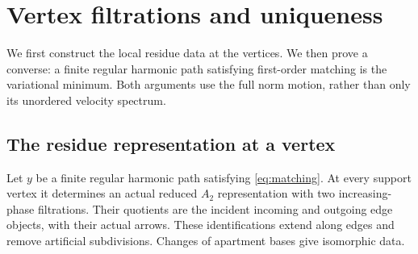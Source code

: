 \section{Vertex filtrations and uniqueness}\label{sec:matchinguniqueness}

We first construct the local residue data at the vertices. We then prove
a converse: a finite regular harmonic path satisfying first-order matching
is the variational minimum. Both arguments use the full norm motion,
rather than only its unordered velocity spectrum.

\subsection{The residue representation at a vertex}

\begin{proposition}\label{prop:vertexfiltrations}
Let $y$ be a finite regular harmonic path satisfying
\eqref{eq:matching}. At every support vertex it determines an
actual reduced $A_2$ representation with two increasing-phase
filtrations. Their quotients are the incident incoming and
outgoing edge objects, with their actual arrows. These
identifications extend along edges and remove artificial
subdivisions. Changes of apartment bases give isomorphic data.
\end{proposition}

